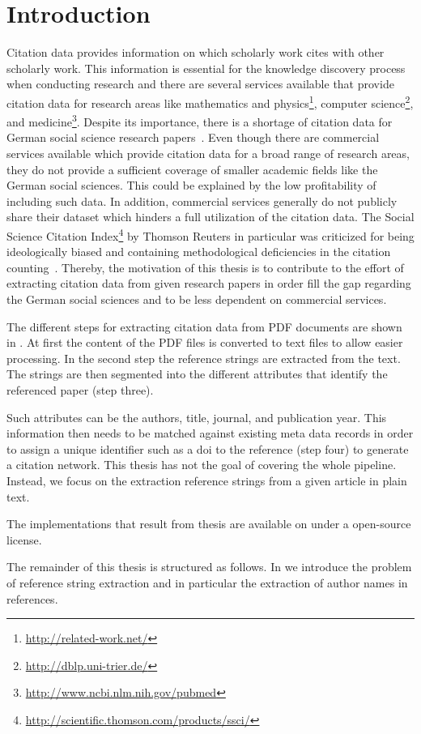 \chapter{Introduction}\label{cha:introduction}



Citation data provides information on which scholarly work cites with other scholarly work.
This information is essential for the knowledge discovery process when conducting research and there are several services available that provide citation data for research areas like mathematics and physics\footnote{\url{http://related-work.net/}}, computer science\footnote{\url{http://dblp.uni-trier.de/}}, and medicine\footnote{\url{http://www.ncbi.nlm.nih.gov/pubmed}}.
Despite its importance, there is a shortage of citation data for German social science research papers~\cite{herb2015open}.
Even though there are commercial services available which provide citation data for a broad range of research areas, they do not provide a sufficient coverage of smaller academic fields like the German social sciences.
This could be explained by the low profitability of including such data.
In addition, commercial services generally do not publicly share their dataset which hinders a full utilization of the citation data.
The Social Science Citation Index\footnote{\url{http://scientific.thomson.com/products/ssci/}} by Thomson Reuters in particular was criticized for being ideologically biased and containing methodological deficiencies in the citation counting~\cite{klein2004social}.
Thereby, the motivation of this thesis is to contribute to the effort of extracting citation data from given research papers in order fill the gap regarding the German social sciences and to be less dependent on commercial services.

\bigskip

The different steps for extracting citation data from PDF documents are shown in .
At first the content of the PDF files is converted to text files to allow easier processing.
In the second step the reference strings are extracted from the text.
The strings are then segmented into the different attributes that identify the referenced paper (step three).

Such attributes can be the authors, title, journal, and publication year.
This information then needs to be matched against existing meta data records in order to assign a unique identifier such as a \gls{doi} to the reference (step four) to generate a citation network.
This thesis has not the goal of covering the whole pipeline.
Instead, we focus on the extraction reference strings from a given article in plain text.


The implementations that result from thesis are available on  under a open-source license.


The remainder of this thesis is structured as follows.
In  we introduce the problem of reference string extraction and in particular the extraction of author names in references.


